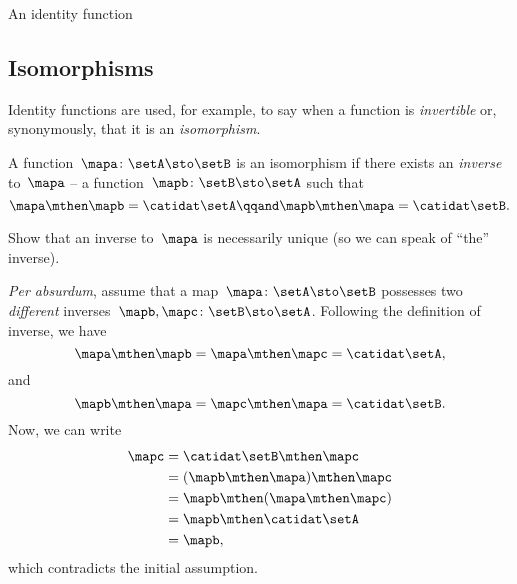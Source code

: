 \begin{marginfigure}
    \centering
    \caption{An identity function}
    \label{fig:identity-function}
\end{marginfigure}

\subsection{Isomorphisms}

Identity functions are used, for example, to say when a function is \emph{invertible} or, synonymously, that it is an \emph{isomorphism}.

\begin{ctdefinition}[Isomorphism]
    \label{def:function-isomorphism}
    A function~$\mapa \colon \setA \sto \setB$ is an isomorphism if there exists an \emph{inverse} to~$\mapa$ -- a function~$\mapb \colon \setB \sto \setA$ such that
    \begin{equation}
        \label{eq:isomorphism-equations}
        \mapa \mthen \mapb = \catidat\setA
        \qqand
        \mapb \mthen \mapa = \catidat\setB.
    \end{equation}
\end{ctdefinition}

\begin{exercise}\label{ex:uniqueness-of-inverse-function}
    Show that an inverse to~$\mapa$ is necessarily unique (so we can speak of ``the'' inverse).
\end{exercise}

\begin{solution}
    \emph{Per absurdum}, assume that a map~$\mapa\colon \setA \sto \setB$ possesses two \emph{different} inverses~$\mapb,\mapc\colon \setB \sto \setA$.
    Following the definition of inverse, we have
    \begin{equation}
        \mapa \mthen \mapb=\mapa \mthen \mapc=\catidat\setA,
    \end{equation}
    and
    \begin{equation}
        \mapb \mthen \mapa=\mapc \mthen \mapa=\catidat\setB.
    \end{equation}
    Now, we can write
    \begin{equation}
        \begin{aligned}
            \mapc & =\catidat\setB \mthen \mapc \\
                  & =(\mapb \mthen \mapa)\mthen \mapc \\
                  & =\mapb\mthen (\mapa \mthen \mapc) \\
                  & =\mapb \mthen \catidat\setA \\
                  & =\mapb,
        \end{aligned}
    \end{equation}
    which contradicts the initial assumption.
\end{solution}


